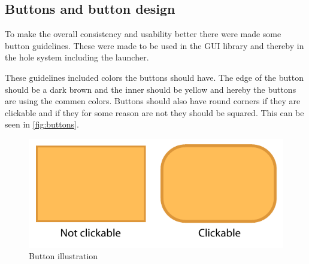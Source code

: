 \subsection{Buttons and button design}
\label{GUI:buttons}

To make the overall consistency and usability better there were made some button guidelines. These were made to be used in the \giraf[] GUI library and thereby in the hole \giraf[] system including the launcher.

These guidelines included colors the buttons should have. The edge of the button should be a dark brown and the inner should be yellow and hereby the buttons are using the commen \giraf[] colors. Buttons should also have round corners if they are clickable and if they for some reason are not they should be squared. This can be seen in \autoref{fig:buttons}.

\begin{figure}[h!]
	\centering
	\includegraphics[scale=0.6]{gfx/buttons.pdf}
	\caption{Button illustration}
	\label{fig:buttons}
\end{figure}